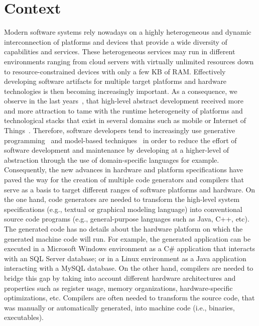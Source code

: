 

\section{Context}
Modern software systems rely nowadays on a highly heterogeneous and dynamic interconnection of platforms and devices that provide a wide diversity of capabilities and services. These heterogeneous services may run in different environments ranging from cloud servers with virtually unlimited resources down to resource-constrained devices with only a few KB of RAM. Effectively developing software artifacts for multiple target platforms and hardware technologies is then becoming increasingly important. As a consequence, we observe in the last years~\cite{Czarnecki:2000:GPM:345203}, that high-level abstract development received more and more attraction to tame with the runtime heterogeneity of platforms and technological stacks that exist in several domains such as mobile or Internet of Things~\cite{betz2011improving}.
Therefore, software developers tend to increasingly use generative programming~\cite{Czarnecki:2000:GPM:345203} and model-based techniques~\cite{france2007model} in order to reduce the effort of software development and maintenance by developing at a higher-level of abstraction through the use of domain-specific languages for example. 
Consequently, the new advances in hardware and platform specifications have paved the way for the creation of multiple code generators and compilers that serve as a basis to target different ranges of software platforms and hardware. 
On the one hand, code generators are needed to transform the high-level system specifications (e.g., textual or graphical modeling language) into conventional source code programs (e.g., general-purpose languages such as Java, C++, etc). The generated code has no details about the hardware platform on which the generated machine code will run. For example, the generated application can be executed in a Microsoft Windows environment as a C\# application that interacts with an SQL Server database; or in a Linux environment as a Java application interacting with a MySQL database. 
On the other hand, compilers are needed to bridge this gap by taking into account different hardware architectures and properties such as register usage, memory organizations, hardware-specific optimizations, etc. Compilers are often needed to transform the source code, that was manually or automatically generated, into machine code (i.e., binaries, executables). 


